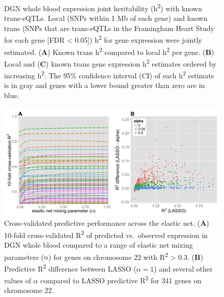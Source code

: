 \documentclass[]{article}
\begin{document}
\begin{figure}[htbp]
\caption{DGN whole blood expression joint heritability
(h\textsuperscript{2}) with known trans-eQTLs. Local (SNPs within 1 Mb
of each gene) and known trans (SNPs that are trans-eQTLs in the
Framingham Heart Study for each gene {[}FDR \textless{} 0.05{]})
h\textsuperscript{2} for gene expression were jointly estimated.
(\textbf{A}) Known trans h\textsuperscript{2} compared to local
h\textsuperscript{2} per gene. (\textbf{B}) Local and (\textbf{C}) known
trans gene expression h\textsuperscript{2} estimates ordered by
increasing h\textsuperscript{2}. The 95\% confidence interval (CI) of
each h\textsuperscript{2} estimate is in gray and genes with a lower
bound greater than zero are in blue.}
\end{figure}

\begin{figure}[htbp]
\centering
\includegraphics{GenArch_manuscript_files/figure-latex/EN-1.pdf}
\caption{Cross-validated predictive performance across the elastic net.
(\textbf{A}) 10-fold cross-validated R\textsuperscript{2} of predicted
vs.~observed expression in DGN whole blood compared to a range of
elastic net mixing parameters (\(\alpha\)) for genes on chromosome 22
with R\textsuperscript{2} \textgreater{} 0.3. (\textbf{B}) Predictive
R\textsuperscript{2} difference between LASSO (\(\alpha = 1\)) and
several other values of \(\alpha\) compared to LASSO predictive
R\textsuperscript{2} for 341 genes on chromosome 22.}
\end{figure}
\end{document}
